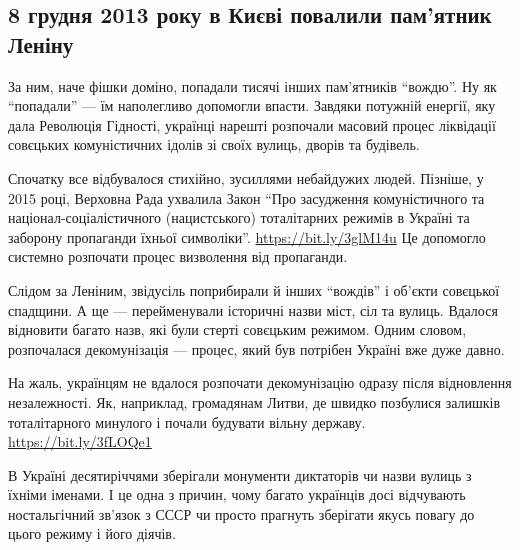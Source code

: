  
 
 
 
 
 
\subsection{8 грудня 2013 року в Києві повалили пам’ятник Леніну}
\label{sec:08_11_2020.fb.promovu.1.lenin}

За ним, наче фішки доміно, попадали тисячі інших пам’ятників \enquote{вождю}. Ну як
\enquote{попадали} — їм наполегливо допомогли впасти.  Завдяки потужній енергії, яку
дала Революція Гідності, українці нарешті розпочали масовий процес ліквідації
совєцьких комуністичних ідолів зі своїх вулиць, дворів та будівель.

Спочатку все відбувалося стихійно, зусиллями небайдужих людей. Пізніше, у 2015
році, Верховна Рада ухвалила Закон \enquote{Про засудження комуністичного та
націонал-соціалістичного (нацистського) тоталітарних режимів в Україні та
заборону пропаганди їхньої символіки}. \url{https://bit.ly/3glM14u} Це допомогло
системно розпочати процес визволення від пропаганди.

Слідом за Леніним, звідусіль поприбирали й інших \enquote{вождів} і об’єкти совєцької
спадщини. А ще — перейменували історичні назви міст, сіл та вулиць. Вдалося
відновити багато назв, які були стерті совєцьким режимом. Одним словом,
розпочалася декомунізація — процес, який був потрібен Україні вже дуже давно.

На жаль, українцям не вдалося розпочати декомунізацію одразу після відновлення
незалежності. Як, наприклад, громадянам Литви, де швидко позбулися залишків
тоталітарного минулого і почали будувати вільну державу. \url{https://bit.ly/3fLOQe1}  

В Україні десятиріччями зберігали монументи диктаторів чи назви вулиць з їхніми
іменами. І це одна з причин, чому багато українців досі відчувають
ностальгічний зв’язок з СССР чи просто прагнуть зберігати якусь повагу до цього
режиму і його діячів. 

